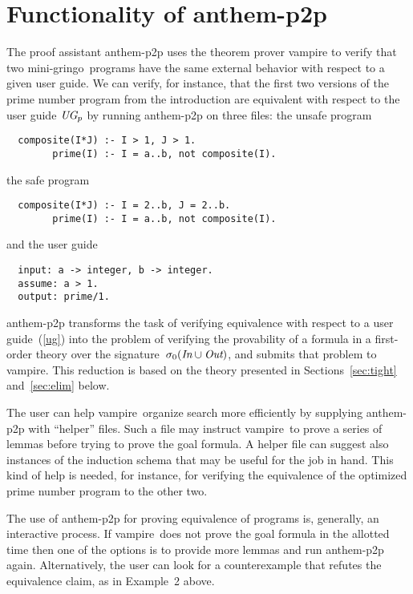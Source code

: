 \documentclass{new_tlp}
\def\gringo{{\sc gringo}}
\def\vampire{{\sc vampire}}
\begin{document}
\section{Functionality of {\sc anthem-p2p}}

The proof assistant {\sc anthem-p2p} uses the theorem prover \hbox{\vampire}
to verify that two mini-\gringo\ programs have the
same external behavior with respect to a given user guide.
We can verify, for instance,
that the first two versions of the prime number program
from the introduction are equivalent with respect to the user guide
$\emph{UG}_p$ by running {\sc anthem-p2p} on three files: the
unsafe program
\begin{verbatim}
  composite(I*J) :- I > 1, J > 1.
        prime(I) :- I = a..b, not composite(I).
\end{verbatim}
the safe program
\begin{verbatim}
  composite(I*J) :- I = 2..b, J = 2..b.
        prime(I) :- I = a..b, not composite(I).
\end{verbatim}
and the user guide
\begin{verbatim}
  input: a -> integer, b -> integer.
  assume: a > 1.
  output: prime/1.
\end{verbatim}
{\sc anthem-p2p} transforms the task of verifying equivalence
with respect to a user guide~(\ref{ug}) into the problem of verifying
the provability of a formula in a first-order theory over the
signature~$\sigma_0(\emph{In}\cup\emph{Out})$,
and submits that problem to \vampire.  This reduction is based on the theory
presented in Sections~\ref{sec:tight} and~\ref{sec:elim} below.

The user can help \vampire\ organize search more efficiently by
supplying {\sc anthem-p2p} with ``helper'' files.  Such a file may instruct
\vampire\ to prove a series of lemmas before trying to prove the goal formula.
A helper file can suggest also instances of the induction schema that may be
useful for the job in hand.  This kind of help is needed, for instance, for
verifying the equivalence of the optimized prime number program to the
other two.

The use of {\sc anthem-p2p} for proving
equivalence of programs is, generally, an interactive process.
If \vampire\ does not prove the goal formula in the allotted time then one of
the options is to provide more lemmas and run {\sc anthem-p2p}
again.  Alternatively, the user can look for a counterexample that refutes the
equivalence claim, as in Example~2 above.
\end{document}

